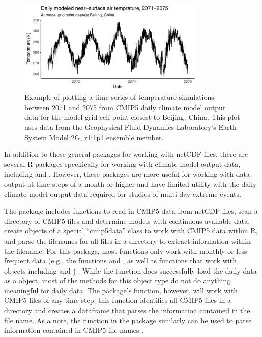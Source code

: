 \begin{figure}
\begin{center}
\includegraphics[width = 0.8\textwidth]{timeseriesexample}
\end{center}
\caption{Example of plotting a time series of temperature simulations between 2071 and 2075 from CMIP5 daily climate model output data for the model grid cell point closest to Beijing, China. This plot uses data from the Geophysical Fluid Dynamics Laboratory's Earth System Model 2G, r1i1p1 ensemble member.}
\label{fig:timeseries}
\end{figure}

In addition to these general packages for working with netCDF files,
there are several R packages specifically for working with climate model
output data, including  \citep{RCMIP5} and 
\citep{wux}. However, these packages are more useful for working with
data output at time steps of a month or higher and have limited utility
with the daily climate model output data required for studies of
multi-day extreme events.

The  package includes functions to read in CMIP5 data from
netCDF files, scan a directory of CMIP5 files and determine models with
continuous available data, create objects of a special ``cmip5data''
class to work with CMIP5 data within R, and parse the filenames for all
files in a directory to extract information within the filename. For
this package, most functions only work with monthly or less frequent
data (e.g., the functions  and ,
as well as functions that work with  objects including
 and ) \citep{RCMIP5}.
While the  function does successfully load the daily
data as a  object, most of the methods for this object
type do not do anything meaningful for daily data. The package's
 function, however, will work with CMIP5 files of any
time step; this function identifies all CMIP5 files in a directory and
creates a dataframe that parses the information contained in the file
name. As a note, the  function in the
 package similarly can be used to parse information
contained in CMIP5 file names \citep{ncdf4.helpers}.

